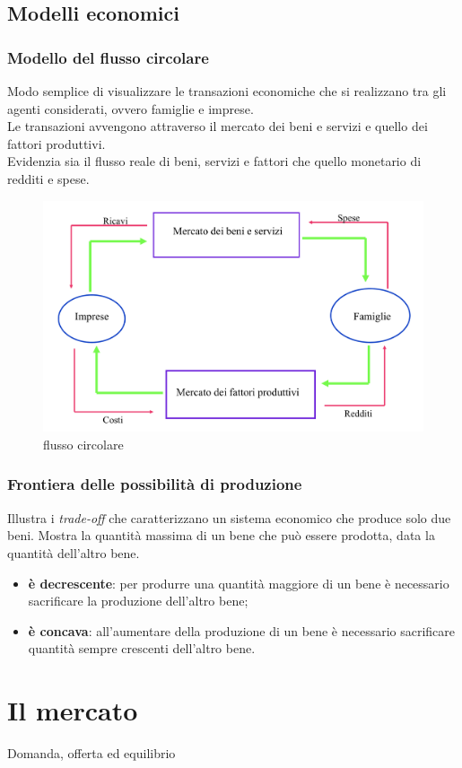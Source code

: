 \documentclass{report}
\begin{document}
	\section{Modelli economici}
	\subsection{Modello del flusso circolare}
	Modo semplice di visualizzare le transazioni economiche che si realizzano tra gli agenti considerati, ovvero famiglie e imprese.\medskip \\Le transazioni avvengono attraverso il mercato dei beni e servizi e quello dei fattori produttivi.\medskip \\Evidenzia sia il flusso reale di beni, servizi e fattori che quello monetario di redditi e spese.
	\begin{figure}[h]
		\centering
		\includegraphics[width=0.7\linewidth]{images/flusso-circolare}
		\caption{flusso circolare}
		\label{fig:flusso-circolare}
	\end{figure}
	\subsection{Frontiera delle possibilità di produzione}
	Illustra i \textit{trade-off} che caratterizzano un sistema economico che produce solo due beni. Mostra la quantità massima di un bene che può essere prodotta, data la quantità dell'altro bene.
	\begin{itemize}
		\item \textbf{è decrescente}: per produrre una quantità maggiore di un bene è necessario sacrificare la produzione dell'altro bene;
		\item \textbf{è concava}: all'aumentare della produzione di un bene è necessario sacrificare quantità sempre crescenti dell'altro bene.
	\end{itemize}
	\chapter{Il mercato}
	\large Domanda, offerta ed equilibrio
\end{document}
